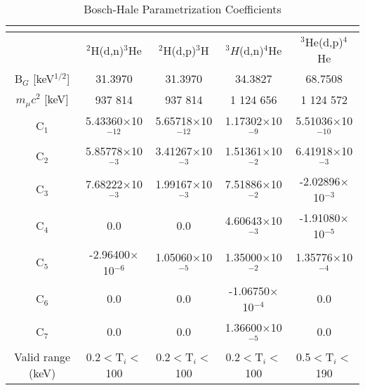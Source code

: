\begin{table}[h!]\small
  \noindent
  \centering
  \caption{Bosch-Hale Parametrization Coefficients}
  \begin{tabular}{c | c c | c | c}
    \multicolumn{5}{c}{}\\
    \hline
    & $^2$H(d,n)$^3$He & $^2$H(d,p)$^3$H & $^3H$(d,n)$^4$He & $^3$He(d,p)$^4$He\\
    \hline\hline
    B$_G$ [keV$^{1/2}$] & 31.3970 & 31.3970 & 34.3827   & 68.7508 \\
    $m_\mu c^2$ [keV]   & 937 814 & 937 814 & 1 124 656 & 1 124 572 \\
    \hline
    C$_1$& 5.43360$\times$10$^{-12}$  & 5.65718$\times$10$^{-12}$ & 1.17302$\times$10$^{-9}$  & 5.51036$\times$10$^{-10}$ \\
    C$_2$  & 5.85778$\times$10$^{-3}$   & 3.41267$\times$10$^{-3}$  & 1.51361$\times$10$^{-2}$  & 6.41918$\times$10$^{-3}$ \\
    C$_3$  & 7.68222$\times$10$^{-3}$   & 1.99167$\times$10$^{-3}$  & 7.51886$\times$10$^{-2}$  & -2.02896$\times$10$^{-3}$ \\
    C$_4$  & 0.0                        & 0.0                       & 4.60643$\times$10$^{-3}$  & -1.91080$\times$10$^{-5}$ \\
    C$_5$  & -2.96400$\times$10$^{-6}$  & 1.05060$\times$10$^{-5}$  & 1.35000$\times$10$^{-2}$  & 1.35776$\times$10$^{-4}$ \\
    C$_6$  & 0.0                        & 0.0                       & -1.06750$\times$10$^{-4}$ & 0.0 \\
    C$_7$& 0.0                      & 0.0                       & 1.36600$\times$10$^{-5}$  & 0.0 \\
    \hline
    Valid range (keV) & 0.2$<$T$_i<$100 & 0.2$<$T$_i<$100 & 0.2$<$T$_i<$100 & 0.5$<$T$_i<$190\\
    \hline
  \end{tabular}
  \label{table:rrParam}
\end{table}

